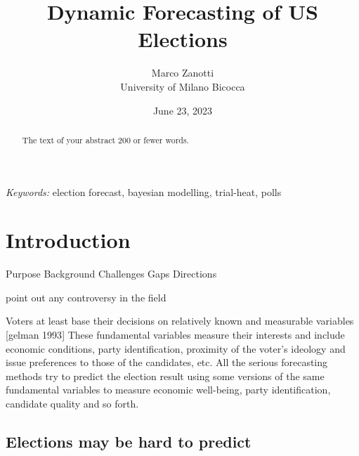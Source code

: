 \documentclass[
  12pt]{article}
\begin{document}
\def\spacingset#1{\renewcommand{\baselinestretch}%
{#1}\small\normalsize} \spacingset{1}



\date{June 23, 2023}
\title{\bf Dynamic Forecasting of US Elections}
\author{
Marco Zanotti\\
University of Milano Bicocca\\
}
\maketitle

\bigskip
\bigskip
\begin{abstract}
The text of your abstract 200 or fewer words.
\end{abstract}

\noindent%
{\it Keywords:} election forecast, bayesian modelling, trial-heat, polls
\vfill

\newpage
\spacingset{1.9} %
\ifdefined\Shaded\renewenvironment{Shaded}{\begin{tcolorbox}[enhanced, borderline west={3pt}{0pt}{shadecolor}, frame hidden, breakable, sharp corners, boxrule=0pt, interior hidden]}{\end{tcolorbox}}\fi

\hypertarget{sec-intro}{%
\section{Introduction}\label{sec-intro}}

Purpose Background Challenges Gaps Directions

point out any controversy in the field

Voters at least base their decisions on relatively known and measurable
variables {[}gelman 1993{]} These fundamental variables measure their
interests and include economic conditions, party identification,
proximity of the voter's ideology and issue preferences to those of the
candidates, etc. All the serious forecasting methods try to predict the
election result using some versions of the same fundamental variables to
measure economic well-being, party identification, candidate quality and
so forth.

\hypertarget{elections-may-be-hard-to-predict}{%
\subsection{Elections may be hard to
predict}\label{elections-may-be-hard-to-predict}}
\end{document}
